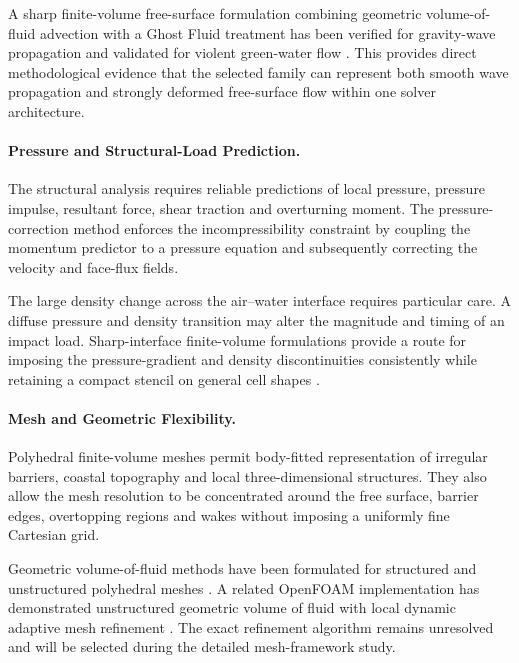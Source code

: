 A sharp finite-volume free-surface formulation combining geometric
volume-of-fluid advection with a Ghost Fluid treatment has been verified
for gravity-wave propagation and validated for violent green-water flow
\parencite{vukcevic2018sharp}. This provides direct methodological
evidence that the selected family can represent both smooth wave
propagation and strongly deformed free-surface flow within one solver
architecture.

\paragraph{Pressure and Structural-Load Prediction.}
\label{sec:num-local-three-dimensional-pressure-load-rationale}

The structural analysis requires reliable predictions of local pressure,
pressure impulse, resultant force, shear traction and overturning
moment. The pressure-correction method enforces the incompressibility
constraint by coupling the momentum predictor to a pressure equation and
subsequently correcting the velocity and face-flux fields.

The large density change across the air--water interface requires
particular care. A diffuse pressure and density transition may alter the
magnitude and timing of an impact load. Sharp-interface finite-volume
formulations provide a route for imposing the pressure-gradient and
density discontinuities consistently while retaining a compact stencil
on general cell shapes \parencite{vukcevic2018sharp}.

\paragraph{Mesh and Geometric Flexibility.}
\label{sec:num-local-three-dimensional-mesh-rationale}

Polyhedral finite-volume meshes permit body-fitted representation of
irregular barriers, coastal topography and local three-dimensional
structures. They also allow the mesh resolution to be concentrated
around the free surface, barrier edges, overtopping regions and wakes
without imposing a uniformly fine Cartesian grid.

Geometric volume-of-fluid methods have been formulated for structured
and unstructured polyhedral meshes \parencite{roenby2016computational}.
A related OpenFOAM implementation has demonstrated unstructured
geometric volume of fluid with local dynamic adaptive mesh refinement
\parencite{maric2013vofoam}. The exact refinement algorithm remains
unresolved and will be selected during the detailed mesh-framework
study.

